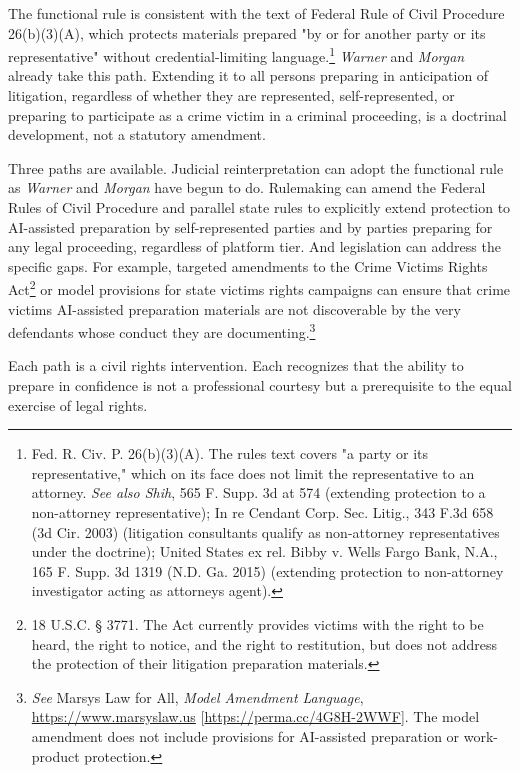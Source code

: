 \documentclass[
  12pt,
]{article}
\begin{document}
The functional rule is consistent with the text of Federal Rule of Civil
Procedure 26(b)(3)(A), which protects materials prepared "by or for
another party or its representative" without credential-limiting
language.\footnote{Fed. R. Civ. P. 26(b)(3)(A). The
  rule\textquotesingle s text covers "a party or its representative,"
  which on its face does not limit the representative to an attorney.
  \emph{See also Shih}, 565 F. Supp. 3d at 574 (extending protection to
  a non-attorney representative); In re Cendant Corp. Sec. Litig., 343
  F.3d 658 (3d Cir. 2003) (litigation consultants qualify as
  non-attorney representatives under the doctrine); United States ex
  rel. Bibby v. Wells Fargo Bank, N.A., 165 F. Supp. 3d 1319 (N.D. Ga.
  2015) (extending protection to non-attorney investigator acting as
  attorney\textquotesingle s agent).} \emph{Warner} and \emph{Morgan}
already take this path. Extending it to all persons preparing in
anticipation of litigation, regardless of whether they are represented,
self-represented, or preparing to participate as a crime victim in a
criminal proceeding, is a doctrinal development, not a statutory
amendment.

Three paths are available. Judicial reinterpretation can adopt the
functional rule as \emph{Warner} and \emph{Morgan} have begun to do.
Rulemaking can amend the Federal Rules of Civil Procedure and parallel
state rules to explicitly extend protection to AI-assisted preparation
by self-represented parties and by parties preparing for any legal
proceeding, regardless of platform tier. And legislation can address the
specific gaps. For example, targeted amendments to the Crime
Victims\textquotesingle{} Rights Act\footnote{18 U.S.C. § 3771. The Act
  currently provides victims with the right to be heard, the right to
  notice, and the right to restitution, but does not address the
  protection of their litigation preparation materials.} or model
provisions for state victims\textquotesingle{} rights campaigns can
ensure that crime victims\textquotesingle{} AI-assisted preparation
materials are not discoverable by the very defendants whose conduct they
are documenting.\footnote{\emph{See} Marsy\textquotesingle s Law for
  All, \emph{Model Amendment Language}, \url{https://www.marsyslaw.us}
  {[}\url{https://perma.cc/4G8H-2WWF}{]}. The model amendment does not
  include provisions for AI-assisted preparation or work-product
  protection.}

Each path is a civil rights intervention. Each recognizes that the
ability to prepare in confidence is not a professional courtesy but a
prerequisite to the equal exercise of legal rights.
\end{document}
